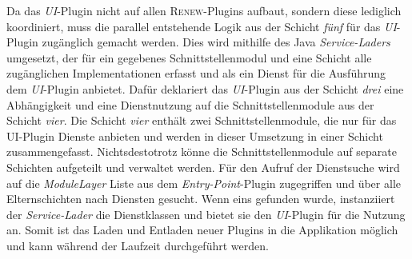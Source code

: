 	Da das \textit{UI}-Plugin nicht auf allen \textsc{Renew}-Plugins aufbaut, sondern diese lediglich koordiniert, muss die parallel entstehende Logik aus der Schicht \textit{fünf} für das \textit{UI}-Plugin zugänglich gemacht werden. Dies wird mithilfe des Java \textit{Service-Laders} umgesetzt, der für ein gegebenes Schnittstellenmodul und eine Schicht alle zugänglichen Implementationen erfasst und als ein Dienst für die Ausführung dem \textit{UI}-Plugin anbietet. Dafür deklariert das \textit{UI}-Plugin aus der Schicht \textit{drei} eine Abhängigkeit und eine Dienstnutzung auf die Schnittstellenmodule aus der Schicht \textit{vier}. Die Schicht \textit{vier} enthält zwei Schnittstellenmodule, die nur für das UI-Plugin Dienste anbieten und werden in dieser Umsetzung in einer Schicht zusammengefasst. Nichtsdestotrotz könne die Schnittstellenmodule auf separate Schichten aufgeteilt und verwaltet werden. \newline 
	Für den Aufruf der Dienstsuche wird auf die \textit{ModuleLayer} Liste aus dem \textit{Entry-Point}-Plugin zugegriffen und über alle Elternschichten nach Diensten gesucht. Wenn eins gefunden wurde, instanziiert der \textit{Service-Lader} die Dienstklassen und bietet sie den \textit{UI}-Plugin für die Nutzung an. Somit ist das Laden und Entladen neuer Plugins in die Applikation möglich und kann während der Laufzeit durchgeführt werden.  

